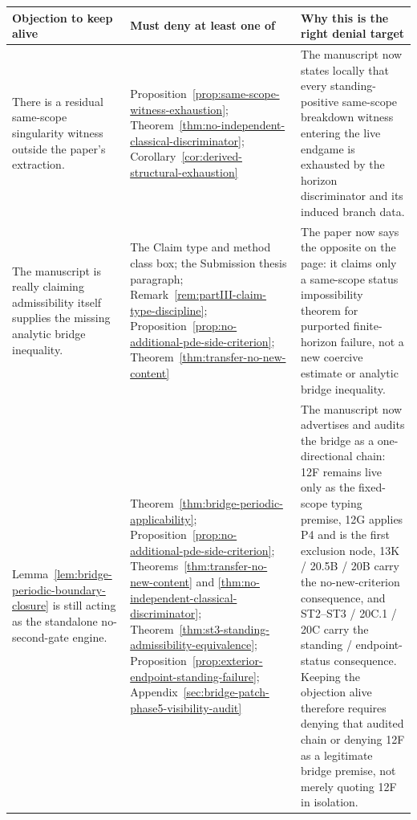 \begin{tcolorbox}[title={Denial map: what must be denied to keep each objection alive}, colback=blue!2!white, colframe=blue!55!black, boxsep=1pt, left=2pt, right=2pt, top=2pt, bottom=2pt]
\scriptsize
\renewcommand{\arraystretch}{1.08}
\setlength{\tabcolsep}{3pt}
\begin{tabularx}{\textwidth}{@{}L{0.33\textwidth}L{0.31\textwidth}Y@{}}
\toprule
\textbf{Objection to keep alive} & \textbf{Must deny at least one of} & \textbf{Why this is the right denial target}\\
\midrule
There is a residual same-scope singularity witness outside the paper's extraction. & Proposition~\ref{prop:same-scope-witness-exhaustion}; Theorem~\ref{thm:no-independent-classical-discriminator}; Corollary~\ref{cor:derived-structural-exhaustion} & The manuscript now states locally that every standing-positive same-scope breakdown witness entering the live endgame is exhausted by the horizon discriminator and its induced branch data.\\
The manuscript is really claiming admissibility itself supplies the missing analytic bridge inequality. & The Claim type and method class box; the Submission thesis paragraph; Remark~\ref{rem:partIII-claim-type-discipline}; Proposition~\ref{prop:no-additional-pde-side-criterion}; Theorem~\ref{thm:transfer-no-new-content} & The paper now says the opposite on the page: it claims only a same-scope status impossibility theorem for purported finite-horizon failure, not a new coercive estimate or analytic bridge inequality.\\
Lemma~\ref{lem:bridge-periodic-boundary-closure} is still acting as the standalone no-second-gate engine. & Theorem~\ref{thm:bridge-periodic-applicability}; Proposition~\ref{prop:no-additional-pde-side-criterion}; Theorems~\ref{thm:transfer-no-new-content} and \ref{thm:no-independent-classical-discriminator}; Theorem~\ref{thm:st3-standing-admissibility-equivalence}; Proposition~\ref{prop:exterior-endpoint-standing-failure}; Appendix~\ref{sec:bridge-patch-phase5-visibility-audit} & The manuscript now advertises and audits the bridge as a one-directional chain: 12F remains live only as the fixed-scope typing premise, 12G applies P4 and is the first exclusion node, 13K / 20.5B / 20B carry the no-new-criterion consequence, and ST2--ST3 / 20C.1 / 20C carry the standing / endpoint-status consequence. Keeping the objection alive therefore requires denying that audited chain or denying 12F as a legitimate bridge premise, not merely quoting 12F in isolation.\\

\end{tabularx}
\end{tcolorbox}
